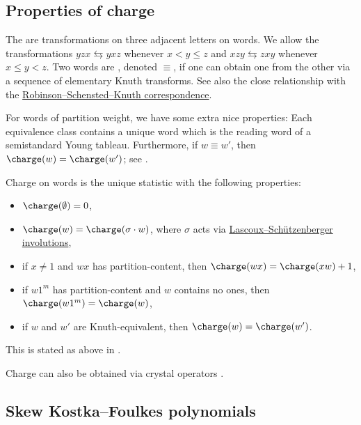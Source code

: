 \subsection[chargeProperties]{Properties of charge}


The \label{elementaryKnuthTransform} are
transformations on three adjacent letters on words.  We allow the
transformations $yzx \leftrightarrows yxz$ whenever $x \lt y\leq z$
and $xzy \leftrightarrows zxy$ whenever $x \leq y \lt z$.
Two words are \label{knuthEquivalent}, denoted
$\equiv$, if one can obtain one from the other via a sequence of elementary
Knuth transforms.
See also the close relationship with the \hyperref[rsk]{Robinson--Schensted--Knuth correspondence}.

For words of partition weight, we have some extra nice properties:
Each equivalence class contains a unique word which is the reading word of a semistandard Young tableau.
Furthermore, if $w \equiv w'$, then $\charge(w)=\charge(w')$;
see \cite[Cor.~2.4.38]{Butler1994}.



\begin{theorem}

Charge on words is the unique statistic with the following properties:
\begin{itemize}
\item $\charge(\emptyset) = 0$, 
\item $\charge(w) = \charge(\sigma\cdot w)$, where $\sigma$ 
acts via \hyperref[crystalOperators]{Lascoux--Schützenberger involutions},
\item if $x \neq 1$ and $wx$ has partition-content, then $\charge(wx) = \charge(xw)+1$,
\item if $w1^m$ has partition-content and $w$ contains no ones, then $\charge(w1^m) = \charge(w)$,
\item if $w$ and $w'$ are Knuth-equivalent, then $\charge(w) = \charge(w')$.
\end{itemize}
\end{theorem}
This is stated as above in \cite[p.~54]{Nelsen2005}.

Charge can also be obtained via crystal operators \cite{Patimo2021x}.


\subsection[skewKostkaFoulkes]{Skew Kostka--Foulkes polynomials}

